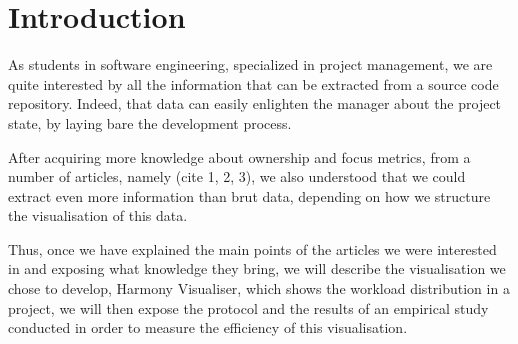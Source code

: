 \section{Introduction}

 As students in software engineering, specialized in project management, we are quite interested by all the information that can be extracted from a source code repository. Indeed, that data can easily enlighten the manager about the project state, by laying bare the development process. 

After acquiring more knowledge about ownership and focus metrics, from a number of articles, namely (cite 1, 2, 3), we also understood that we could extract even more information than brut data, depending on how we structure the visualisation of this data.

Thus, once we have explained the main points of the articles we were interested in and exposing what knowledge they bring, we will describe the visualisation we chose to develop, Harmony Visualiser, which shows the workload distribution in a project, we will then expose the protocol and the results of an empirical study conducted in order to measure the efficiency of this visualisation.